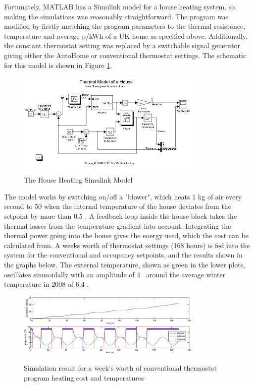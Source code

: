 \documentclass[10.5pt,a4paper,twoside]{report}   %
\begin{document}
Fortunately, MATLAB has a Simulink model for a house heating system, so making the simulations was reasonably straightforward. The program was modified by firstly matching the program parameters to the thermal resistance, temperature and average p/kWh of a UK home as specified above. Additionally, the constant thermostat setting was replaced by a switchable signal generator giving either the AutoHome or conventional thermostat settings. The schematic for this model is shown in Figure \ref{fig:housesimu}.
\begin{figure}[h!]
  \vspace{-10pt}
  \caption{The House Heating Simulink Model}
  \centering
    \includegraphics[width=0.8\textwidth]{images/matlabhouseheat.png}
\label{fig:housesimu}
  \vspace{-10pt}
\end{figure}
\FloatBarrier
The model works by switching on/off a "blower", which heats 1 kg of air every second to 50 \celsius when the internal temperature of the house deviates from the setpoint by more than 0.5 \celsius. A feedback loop inside the house block takes the thermal losses from the temperature gradient into account. Integrating the thermal power going into the house gives the energy used, which the cost can be calculated from. A weeks worth of thermostat settings (168 hours) is fed into the system for the conventional and occupancy setpoints, and the results shown in the graphs below. The external temperature, shown as green in the lower plots, oscillates sinusoidally with an amplitude of 4 \celsius\ around the average winter temperature in 2008 of 6.4 \celsius. 
\begin{figure}[h!]
  \vspace{-10pt}
  \caption{Simulation result for a week's worth of conventional thermostat program  heating cost and temperatures}
  \centering
    \includegraphics[width=0.8\textwidth]{images/thermal_m_conventional.eps}
\label{fig:convsimu}
  \vspace{-10pt}
\end{figure}
\end{document}
